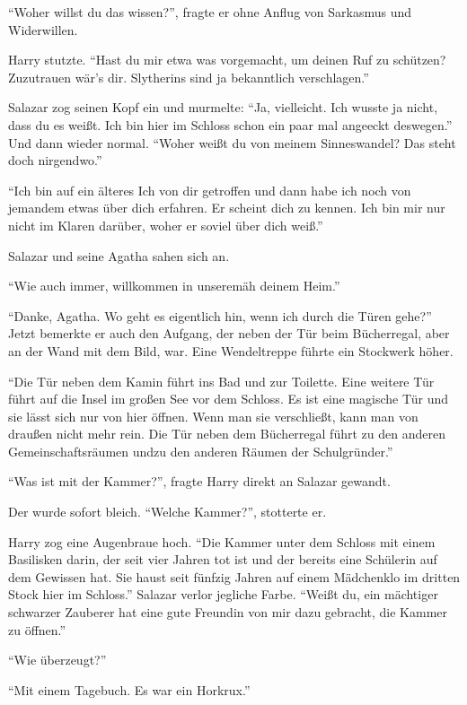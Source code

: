 \enquote{Woher willst du das wissen?}, fragte er ohne Anflug von Sarkasmus und Widerwillen.

Harry stutzte. \enquote{Hast du mir etwa was vorgemacht, um deinen Ruf zu schützen? Zuzutrauen wär’s dir. Slytherins sind ja bekanntlich verschlagen.}

Salazar zog seinen Kopf ein und murmelte: \enquote{Ja, vielleicht. Ich wusste ja nicht, dass du es weißt. Ich bin hier im Schloss schon ein paar mal angeeckt deswegen.} Und dann wieder normal. \enquote{Woher weißt du von meinem Sinneswandel? Das steht doch nirgendwo.}

\enquote{Ich bin auf ein älteres Ich von dir getroffen und dann habe ich noch von jemandem etwas über dich erfahren. Er scheint dich zu kennen. Ich bin mir nur nicht im Klaren darüber, woher er soviel über dich weiß.}

Salazar und seine Agatha sahen sich an.

\enquote{Wie auch immer, willkommen in unserem\abs äh deinem Heim.}

\enquote{Danke, Agatha. Wo geht es eigentlich hin, wenn ich durch die Türen gehe?} Jetzt bemerkte er auch den Aufgang, der neben der Tür beim Bücherregal, aber an der Wand mit dem Bild, war. Eine Wendeltreppe führte ein Stockwerk höher.

\enquote{Die Tür neben dem Kamin führt ins Bad und zur Toilette. Eine weitere Tür führt auf die Insel im großen See vor dem Schloss. Es ist eine magische Tür und sie lässt sich nur von hier öffnen. Wenn man sie verschließt, kann man von draußen nicht mehr rein. Die Tür neben dem Bücherregal führt zu den anderen Gemeinschaftsräumen und\abs zu den anderen Räumen der Schulgründer.}

\enquote{Was ist mit der Kammer?}, fragte Harry direkt an Salazar gewandt.

Der wurde sofort bleich. \enquote{Welche Kammer?}, stotterte er.

Harry zog eine Augenbraue hoch. \enquote{Die Kammer unter dem Schloss mit einem Basilisken darin, der seit vier Jahren tot ist und der bereits eine Schülerin auf dem Gewissen hat. Sie haust seit fünfzig Jahren auf einem Mädchenklo im dritten Stock hier im Schloss.} Salazar verlor jegliche Farbe. \enquote{Weißt du, ein mächtiger schwarzer Zauberer hat eine gute Freundin von mir dazu gebracht, die Kammer zu öffnen.}

\enquote{Wie überzeugt?}

\enquote{Mit einem Tagebuch. Es war ein Horkrux.}

